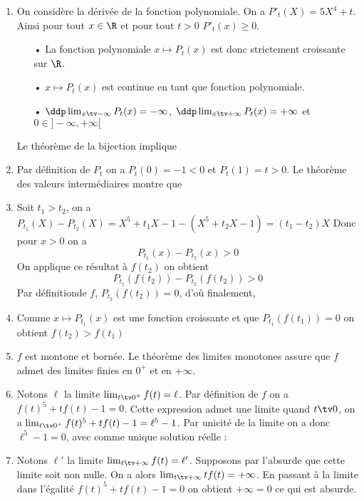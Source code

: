 \documentclass[a4paper, 11pt,reqno]{article}
\begin{document}
\begin{correction}
\begin{enumerate}
\item On considère la dérivée de la fonction polynomiale. On a $P'_t(X) = 5X^4 +t $. Ainsi pour tout $x\in \R$ et pour tout $t>0$ 
$P'_t(x) \geq 0$. 
\begin{itemize}
\item[•] La fonction polynomiale $x\mapsto P_t(x)$ est donc strictement croissante  sur $\R$.
\item[•]  $x\mapsto P_t(x)$ est continue en tant que fonction polynomiale.
\item[•] $\ddp \lim_{x\tv -\infty} P_t(x) =-\infty $, $\ddp \lim_{x\tv +\infty} P_t(x) =+\infty$  et $0\in ]-\infty,+\infty[$
\end{itemize}

Le théorème de la bijection implique   

\item Par définition de $P_t$ on a $P_t(0) = -1<0$ et $P_t(1) = t >0$. Le théorème des valeurs intermédiaires montre que 
\conclusion{ $f(t) \in ]0,1[$. }

\item Soit $t_1>t_2 $, on a $P_{t_1} (X)-P_{t_2} (X) = X^5 +t_1X-1 - (X^5 +t_2 X -1) = (t_1-t_2)X$
Donc pour $x>0$ on a 
$$P_{t_1} (x)-P_{t_2} (x)>0$$
On applique ce résultat à $f(t_2)$ on obtient 
$$P_{t_1} (f(t_2))-P_{t_2} (f(t_2))>0$$
Par définitionde $f$, $P_{t_2} (f(t_2))=0$, d'où finalement, 
\item 
Comme $x\mapsto P_{t_1}(x)$ est une fonction croissante et que $P_{t_1}(f(t_1)) =0$ on obtient $f(t_2)> f(t_1)$

\item $f$ est montone et bornée. Le théorème des limites monotones assure que  $f$ admet des limites finies en $0^+$ et en $+\infty$. 


\item Notons $\ell$ la limite  $\lim_{t\tv 0^+}f(t)= \ell$. Par définition de $f$ on a $f(t)^5 +t f(t)-1= 0$. Cette expression admet une limite quand $t\tv 0$, on  a $\lim_{t\tv 0^+} f(t)^5 +t f(t)-1 =\ell^5-1$. Par unicité de la limite on a donc $\ell^5-1 =0$, avec comme unique solution réelle :

\item Notons $\ell'$  la limite  $\lim_{t\tv +\infty }f(t)= \ell'$.
Supposons par l'absurde que cette limite soit non nulle. On a alors $\lim_{t\tv +\infty } tf(t) =+\infty$. En passant à la limite dans l'égalité 
$f(t)^5 +tf(t) -1 =0$ on obtient 
$+\infty =0$ ce qui est absurde. 


\end{enumerate}
\end{correction}
\end{document}
